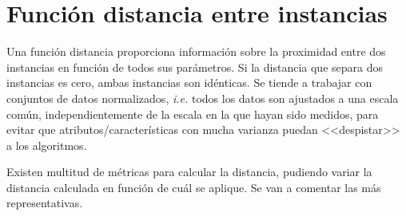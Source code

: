 \section{Función distancia entre instancias}
Una función distancia proporciona información sobre la proximidad entre dos instancias en función de todos sus parámetros. Si la distancia que separa dos instancias es cero, ambas instancias son idénticas. Se tiende a trabajar con conjuntos de datos normalizados, \textit{i.e.} todos los datos son ajustados a una escala común, independientemente de la escala en la que hayan sido medidos, para evitar que atributos/características con mucha varianza puedan <<despistar>> a los algoritmos.

Existen multitud de métricas para calcular la distancia, pudiendo variar la distancia calculada en función de cuál se aplique. Se van a comentar las más representativas.
